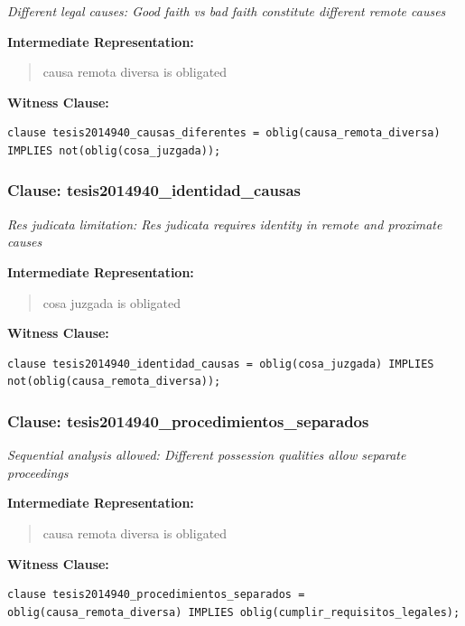\documentclass[11pt,a4paper]{article}
\begin{document}
\textit{Different legal causes: Good faith vs bad faith constitute different remote causes}

\textbf{Intermediate Representation:}

\begin{quote}
causa remota diversa is obligated
\end{quote}

\textbf{Witness Clause:}

\begin{lstlisting}[style=witnessstyle, language=Witness]
clause tesis2014940_causas_diferentes = oblig(causa_remota_diversa) IMPLIES not(oblig(cosa_juzgada));
\end{lstlisting}

\subsubsection{Clause: tesis2014940\_identidad\_causas}

\textit{Res judicata limitation: Res judicata requires identity in remote and proximate causes}

\textbf{Intermediate Representation:}

\begin{quote}
cosa juzgada is obligated
\end{quote}

\textbf{Witness Clause:}

\begin{lstlisting}[style=witnessstyle, language=Witness]
clause tesis2014940_identidad_causas = oblig(cosa_juzgada) IMPLIES not(oblig(causa_remota_diversa));
\end{lstlisting}

\subsubsection{Clause: tesis2014940\_procedimientos\_separados}

\textit{Sequential analysis allowed: Different possession qualities allow separate proceedings}

\textbf{Intermediate Representation:}

\begin{quote}
causa remota diversa is obligated
\end{quote}

\textbf{Witness Clause:}

\begin{lstlisting}[style=witnessstyle, language=Witness]
clause tesis2014940_procedimientos_separados = oblig(causa_remota_diversa) IMPLIES oblig(cumplir_requisitos_legales);
\end{lstlisting}
\end{document}
